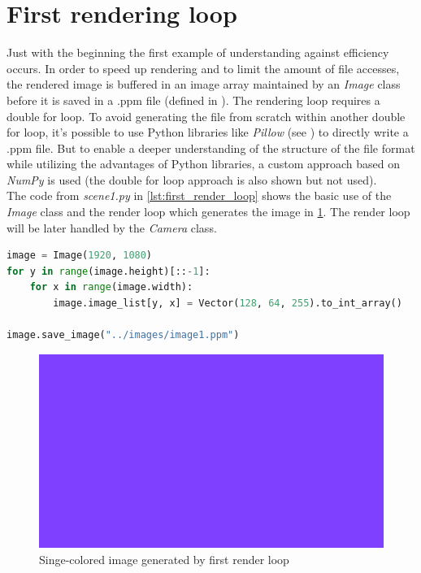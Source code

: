 \documentclass[]{article}
\begin{document}
	\section{First rendering loop}
	Just with the beginning the first example of understanding against efficiency occurs. In order to speed up rendering and to limit the amount of file accesses, the rendered image is buffered in an image array maintained by an \emph{Image} class before it is saved in a .ppm file (defined in \cite{PPM}). The rendering loop requires a double for loop. To avoid generating the file from scratch within another double for loop, it’s possible to use Python libraries like \emph{Pillow} (see \cite{PILLOW}) to directly write a .ppm file. But to enable a deeper understanding of the structure of the file format while utilizing the advantages of Python libraries, a custom approach based on \emph{NumPy} is used (the double for loop approach is also shown but not used).
	\\
	The code from \emph{scene1.py} in \cref{lst:first_render_loop} shows the basic use of the \emph{Image} class and the render loop which generates the image in \cref{fig:image1}. The render loop will be later handled by the \emph{Camera} class.
	
	\begin{lstlisting}[caption={Example for a basic render loop}, language=Python, label=lst:first_render_loop]
image = Image(1920, 1080)
for y in range(image.height)[::-1]:
	for x in range(image.width):
		image.image_list[y, x] = Vector(128, 64, 255).to_int_array()

image.save_image("../images/image1.ppm")
	\end{lstlisting}

	\begin{figure}[h]
		\centering
		\includegraphics[width=0.9\linewidth]{image1}
		\caption{Singe-colored image generated by first render loop}
		\label{fig:image1}
	\end{figure}
\end{document}
